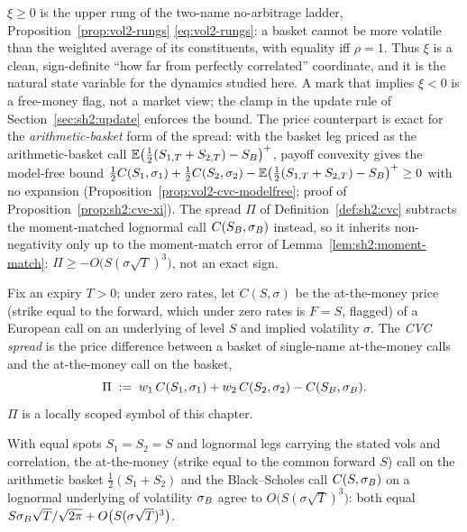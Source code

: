 \begin{remark}\label{rem:sh2:noarb}
$\xi \ge 0$ is the upper rung of the two-name no-arbitrage ladder,
Proposition~\ref{prop:vol2-rungs} \eqref{eq:vol2-rungs}: a basket cannot
be more volatile than the weighted average of its constituents, with
equality iff $\rho = 1$. Thus $\xi$ is a clean,
sign-definite ``how far from perfectly correlated'' coordinate, and it is
the natural state variable for the dynamics studied here. A mark that
implies $\xi < 0$ is a free-money flag, not a market view; the clamp in the
update rule of Section~\ref{sec:sh2:update} enforces the bound. The price
counterpart is exact for the \emph{arithmetic-basket} form of the spread:
with the basket leg priced as the arithmetic-basket call
$\mathbb{E}\bigl(\tfrac12(S_{1,T} + S_{2,T}) - S_B\bigr)^+$, payoff convexity
gives the model-free bound
$\tfrac12 C(S_1, \sigma_1) + \tfrac12 C(S_2, \sigma_2)
- \mathbb{E}\bigl(\tfrac12(S_{1,T} + S_{2,T}) - S_B\bigr)^+ \ge 0$ with no
expansion
(Proposition~\ref{prop:vol2-cvc-modelfree}; proof of
Proposition~\ref{prop:sh2:cvc-xi}). The spread $\Pi$ of
Definition~\ref{def:sh2:cvc} subtracts the moment-matched lognormal call
$C(S_B, \sigma_B)$ instead, so it inherits non-negativity only up to the
moment-match error of Lemma~\ref{lem:sh2:moment-match}:
$\Pi \ge -O\bigl(S(\sigma\sqrt{T})^3\bigr)$, not an exact sign.
\end{remark}

\begin{definition}
\label{def:sh2:cvc}
Fix an expiry $T > 0$; under zero rates, let $C(S, \sigma)$ be the
at-the-money price (strike equal to the forward, which under zero rates is
$F = S$, flagged) of a European call on an underlying of level $S$ and
implied volatility $\sigma$. The \emph{CVC spread} is the price difference
between a basket of single-name at-the-money calls and the at-the-money
call on the basket,
\begin{equation}\label{eq:sh2:cvc-def}
  \Pi \;:=\; w_1\, C(S_1, \sigma_1) + w_2\, C(S_2, \sigma_2)
             - C(S_B, \sigma_B).
\end{equation}
$\Pi$ is a locally scoped symbol of this chapter.
\end{definition}

\begin{lemma}
\label{lem:sh2:moment-match}
With equal spots $S_1 = S_2 = S$ and lognormal legs carrying the stated
vols and correlation, the at-the-money (strike equal to the common forward
$S$) call on the arithmetic basket $\tfrac12(S_1 + S_2)$ and the
Black--Scholes call $C(S, \sigma_B)$ on a lognormal underlying of volatility
$\sigma_B$ agree to $O\bigl(S(\sigma\sqrt{T})^3\bigr)$: both equal
$S \sigma_B \sqrt{T}/\sqrt{2\pi} + O\bigl(S(\sigma\sqrt{T})^3\bigr)$.
\end{lemma}

